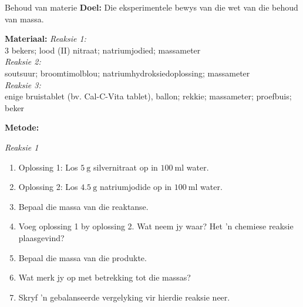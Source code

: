             \begin{i_experiment}{Behoud van materie}
            \nopagebreak
            \label{m38711*eip-453}\noindent{}\textbf{Doel:}
Die eksperimentele bewys van die wet van die behoud van massa.
\par 
\label{m38711*eip792}\noindent{}\textbf{Materiaal:}
\textsl{Reaksie 1:} \\
3 bekers; lood (II) nitraat; natriumjodied; massameter \\
\textsl{Reaksie 2:} \\
 soutsuur; broomtimolblou; natriumhydroksiedoplossing; massameter \\
 \textsl{Reaksie 3:} \\
enige bruistablet (bv. Cal-C-Vita tablet), ballon; rekkie; massameter; proefbuis; beker
\par 
\label{m38711*eip-153}
	\par
      \label{m38711*id72432}\noindent
\textbf{Metode:} \\
\begin{minipage}{.6\textwidth}
\textsl{Reaksie 1} 
\label{m38711*id6342}\begin{enumerate}[noitemsep, label=\textbf{\arabic*}. ] 
            \item Oplossing 1: Los $5~\text{g}$ silvernitraat op in $100~\text{ml}$ water.
\item Oplossing 2: Los $4.5~\text{g}$ natriumjodide op in $100~\text{ml}$ water.
\item Bepaal die massa van die reaktanse.
\item Voeg oplossing 1 by oplossing 2. Wat neem jy waar? Het 'n chemiese reaksie plaasgevind? 
\item Bepaal die massa van die produkte. 
\item Wat merk jy op met betrekking tot die massas?
\item Skryf 'n gebalanseerde vergelyking vir hierdie reaksie neer.
\end{enumerate}
\end{minipage}
\begin{minipage}{.4\textwidth}
 \begin{center}
\end{center}
\end{minipage}
\end{i_experiment}
